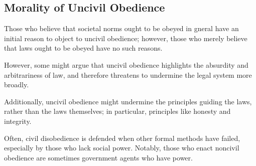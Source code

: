 \documentclass[letterpaper]{article}
\begin{document}
\subsection{Morality of Uncivil Obedience}
Those who believe that societal norms ought to be obeyed in gneral have an initial reason to object to uncivil obedience; however, those who merely believe that laws ought to be obeyed have no such reasons. 

\bigskip

However, some might argue that uncivil obedience highlights the absurdity and arbitrariness of law, and therefore threatens to undermine the legal system more broadly. 

\bigskip 

Additionally, uncivil obedience might undermine the principles guiding the laws, rather than the laws themselves; in particular, principles like honesty and integrity.

\bigskip 

Often, civil disobedience is defended when other formal methods have failed, especially by those who lack social power. Notably, those who enact noncivil obedience are sometimes government agents who have power.
\end{document}

